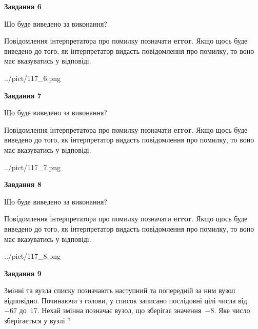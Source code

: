 \documentclass[12pt, ukrainian]{article}
\begin{document}
{\begin {large}
{\begin {center}\textbf{Завдання 6}\end {center}}\par
Що буде виведено за виконання?

Повідомлення інтерпретатора про помилку позначати \textbf{error}.
Якщо щось буде виведено до того, як інтерпретатор видасть повідомлення про помилку, 
то воно має вказуватись у відповіді. \par


\begin{center}
	{../pict/117_6.png}
\end{center}
\newpage

{\begin {center}\textbf{Завдання 7}\end {center}}\par
Що буде виведено за виконання?

Повідомлення інтерпретатора про помилку позначати \textbf{error}.
Якщо щось буде виведено до того, як інтерпретатор видасть повідомлення про помилку, 
то воно має вказуватись у відповіді. \par


\begin{center}
	{../pict/117_7.png}
\end{center}
\newpage

{\begin {center}\textbf{Завдання 8}\end {center}}\par
Що буде виведено за виконання?

Повідомлення інтерпретатора про помилку позначати \textbf{error}.
Якщо щось буде виведено до того, як інтерпретатор видасть повідомлення про помилку, 
то воно має вказуватись у відповіді. \par


\begin{center}
	{../pict/117_8.png}
\end{center}
\newpage

{\begin {center}\textbf{Завдання 9}\end {center}}\par
Змінні  та  вузла списку позначають наступний та попередній за ним вузол відповідно. Починаючи з голови, у список записано послідовні цілі числа від~$-67$ до~$17$. Нехай змінна  позначає вузол, що зберігає значення~$-8$.
Яке число зберігається у вузлі  ?\par
\newpage


\end{large}}
\end{document}
